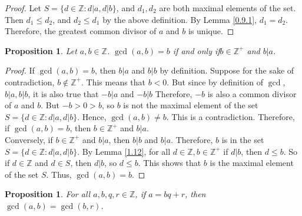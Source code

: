 \documentclass{article}
\newcommand{\Z}{\mathbb{Z}}
\newcommand{\SFTSOC}{Suppose for the sake of contradiction}
\newcommand{\ifff}{if and only if}
\newtheorem{prop}[thm]{Proposition}
\begin{document}
\begin{proof}
Let $S = \{d\in\Z:d|a, d|b\}$, and $d_1, d_2$ are both maximal elements of the set. Then $d_1 \leq d_2$, and $d_2 \leq d_1$ by the above definition. By Lemma \ref{0.9.1}, $d_1=d_2$. Therefore, the greatest common divisor of $a$ and $b$ is unique.
\end{proof}

\begin{prop}
Let $a,b\in \Z$. $\gcd(a,b)=b$ \ifff  \text{ }$b\in \Z^+$ and $b|a$.
\end{prop}

\begin{proof}
If $\gcd(a,b)=b$, then $b|a$ and $b|b$ by definition. \SFTSOC, $b \not\in \Z^+$. This means that $b<0$. But since by definition of $\gcd$, $b|a, b|b$, it is also true that $-b|a$ and $-b|b$ Therefore, $-b$ is also a common divisor of $a$ and $b$. But $-b>0>b$, so $b$ is not the maximal element of the set $S = \{d\in\Z:d|a, d|b\}$. Hence, $\gcd(a,b)\neq b$. This is a contradiction. Therefore, if $\gcd(a,b)=b$, then $b \in \Z^+$ and $b|a$. \\

Conversely, if $b \in \Z^+$ and $b|a$, then $b|b$ and $b|a$. Therefore, $b$ is in the set $S = \{d\in\Z:d|a, d|b\}$. By Lemma \ref{1.12}, for all $d \in \Z, b\in\Z^+$ if $d|b$, then $d \leq b$. So if $d \in \Z$ and $d \in S$, then $d|b$, so $d \leq b$. This shows that $b$ is the maximal element of the set $S$. Thus, $\gcd(a,b) = b$.
\end{proof}

\begin{prop}
\label{2.12}
For all $a, b, q, r \in \Z$, if $a = bq + r$, then $\gcd(a,b) = \gcd(b,r)$.
\end{prop}
\end{document}
